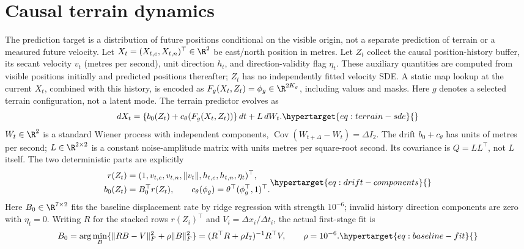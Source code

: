 \section{Causal terrain dynamics}
The prediction target is a distribution of future positions conditional on
the visible origin, not a separate prediction of terrain or a measured
future velocity. Let \(X_t=(X_{t,e},X_{t,n})^\top\in\R^2\) be east/north
position in metres. Let \(Z_t\) collect the causal position-history buffer,
its secant velocity \(v_t\) (metres per second), unit direction \(h_t\),
and direction-validity flag \(\eta_t\). These auxiliary quantities are
computed from visible positions initially and predicted positions thereafter;
\(Z_t\) has no independently fitted velocity SDE. A static map lookup at
the current \(X_t\), combined with this history, is encoded as
\(F_g(X_t,Z_t)=\phi_g\in\R^{2K_g}\), including values and masks.
Here \(g\) denotes a selected terrain configuration, not a latent mode.
The terrain predictor evolves as
\begin{equation}
 dX_t=\{b_0(Z_t)+c_\theta(F_g(X_t,Z_t))\}\,dt+L\,dW_t .
 \label{eq:terrain-sde}\hypertarget{eq:terrain-sde}{}
\end{equation}
\(W_t\in\R^2\) is a standard Wiener process with independent components,
\(\operatorname{Cov}(W_{t+\Delta}-W_t)=\Delta I_2\).
The drift \(b_0+c_\theta\) has units of metres per second;
\(L\in\R^{2\times2}\) is a constant noise-amplitude matrix with units
metres per square-root second. Its covariance is \(Q=LL^\top\), not \(L\)
itself. The two deterministic parts are explicitly
\begin{equation}
 \begin{aligned}
 r(Z_t)&=(1,v_{t,e},v_{t,n},\|v_t\|,h_{t,e},h_{t,n},\eta_t)^\top,\\
 b_0(Z_t)&=B_0^\top r(Z_t),\qquad
 c_\theta(\phi_g)=\theta^\top(\phi_g^\top,1)^\top .
 \end{aligned}
 \label{eq:drift-components}\hypertarget{eq:drift-components}{}
\end{equation}
Here \(B_0\in\R^{7\times2}\) fits the baseline displacement rate by
ridge regression with strength \(10^{-6}\); invalid history direction
components are zero with \(\eta_t=0\).
Writing \(R\) for the stacked rows \(r(Z_i)^\top\) and \(V_i=\Delta x_i/\Delta t_i\),
the actual first-stage fit is
\begin{equation}
 B_0=\arg\min_B\{\|RB-V\|_F^2+\rho\|B\|_F^2\}
     =(R^\top R+\rho I_7)^{-1}R^\top V,\qquad\rho=10^{-6}.
 \label{eq:baseline-fit}\hypertarget{eq:baseline-fit}{}
\end{equation}
